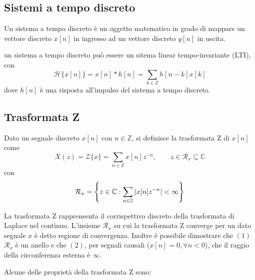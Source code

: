     \subsection{Sistemi a tempo discreto}
        Un sistema a tempo discreto è un oggetto matematico in grado di mappare un vettore discreto $x[n]$ in ingresso ad un vettore discreto $y[n]$ in uscita.
        \begin{figure}[ht]
            \centering 
        \end{figure}
        
        un sistema a tempo discreto può essere un sitema linear tempo-invariante (LTI), con 
        \[
            \mathcal{H}\{x[n]\} = x[n] * h[n] = \sum_{k \in \mathbb{Z}} h[n - k] x[k]
        \]
        dove $h[n]$ è una risposta all'impulso del sistema a tempo discreto.


    \subsection{Trasformata Z}
        \begin{definition}
            Dato un segnale discreto $x[n]$ con $n \in \mathbb{Z}$, si definisce la trasformata Z di $x[n]$ come
            \[
                X(z) = \mathcal{Z}\{x\} = \sum_{n \in \mathbb{Z}} x[n] z^{-n}, \qquad z \in \mathcal{R}_{x} \subseteq \mathbb{C}
            \]
            con 
            \[
                \mathcal{R}_x = \qty{ z \in \mathbb{C} \st \sum_{n \in \mathbb{Z}} |x[n] z^{-n}| < \infty}
            \]
        \end{definition}

        La trasformata Z rapprensenta il corrispettivo discreto della trasformata di Laplace nel continuo.
        L'insieme $\mathcal{R}_{x}$ su cui la trasformata Z converge per un dato segnale $x$ è detto regione di convergenza.
        Inoltre è possibile dimostrare che $(1)$ $\mathcal{R}_{x}$ è un anello e che $(2)$, per segnali causali ($x[n] = 0, \forall n < 0$), che il raggio della circonferenza esterna è $\infty$.

        Alcune delle proprietà della trasformata Z sono:

